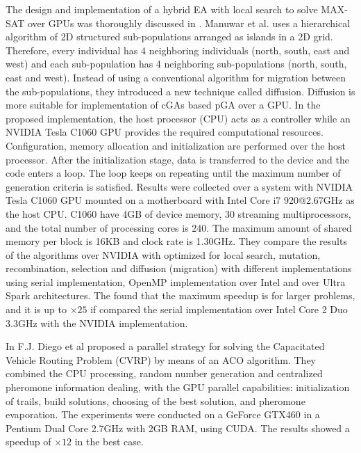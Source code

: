 \documentclass{comjnl}
\begin{document}
The design and implementation of a hybrid EA with local search to solve MAX-SAT over GPUs was thoroughly discussed in \cite{Munawar:2009:HGA:1666141_1666143}. Manuwar et al. uses a hierarchical algorithm of 2D structured sub-populations arranged as islands in a 2D grid. Therefore, every individual has 4 neighboring individuals (north, south, east and west) and each sub-population has 4 neighboring sub-populations (north, south, east and west). Instead of using a conventional algorithm for migration between the sub-populations, they introduced a new technique called diffusion. Diffusion is more suitable for implementation of cGAs based pGA over a GPU. In the proposed implementation, the host processor (CPU) acts as a controller while an NVIDIA Tesla C1060 GPU provides the required computational resources. Configuration, memory allocation and initialization are performed over the host processor. After the initialization stage, data is transferred to the device and the code enters a loop. The loop keeps on repeating until the maximum number of generation criteria is satisfied. Results were collected over a system with NVIDIA Tesla C1060 GPU mounted on a motherboard with Intel Core i7 920@2.67GHz as the host CPU. C1060 have 4GB of device memory, 30 streaming multiprocessors, and the total number of processing cores is 240. The maximum amount of shared memory per block is 16KB and clock rate is 1.30GHz. They compare the results of the algorithms over NVIDIA with optimized for local search, mutation, recombination, selection and diffusion (migration) with different implementations using serial implementation, OpenMP implementation over Intel and over Ultra Spark architectures. The found that the maximum speedup is for larger problems, and it is up to $\times25$ if compared the serial implementation over Intel Core 2 Duo 3.3GHz with the NVIDIA implementation. 

In \cite{fjdiego-vrp} F.J. Diego et al proposed a parallel strategy for solving the Capacitated Vehicle Routing Problem (CVRP) by means of an ACO algorithm. They combined the CPU processing, random number generation and centralized pheromone information dealing, with the GPU parallel capabilities: initialization of trails, build solutions, choosing of the best solution, and pheromone evaporation. The experiments were conducted on a GeForce GTX460 in a Pentium Dual Core 2.7GHz with 2GB RAM, using CUDA. The results showed a speedup of $\times12$ in the best case.
\end{document}
